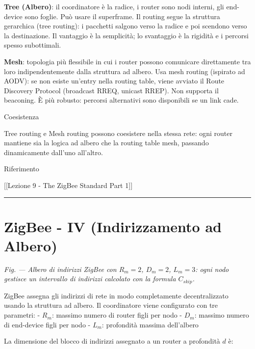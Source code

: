 \documentclass[
  italian,
  openany]{book}
\begin{document}
\textbf{Tree (Albero)}: il coordinatore è la radice, i router sono nodi
interni, gli end-device sono foglie. Può usare il superframe. Il routing
segue la struttura gerarchica (tree routing): i pacchetti salgono verso
la radice e poi scendono verso la destinazione. Il vantaggio è la
semplicità; lo svantaggio è la rigidità e i percorsi spesso subottimali.

\textbf{Mesh}: topologia più flessibile in cui i router possono
comunicare direttamente tra loro indipendentemente dalla struttura ad
albero. Usa mesh routing (ispirato ad AODV): se non esiste un'entry
nella routing table, viene avviato il Route Discovery Protocol
(broadcast RREQ, unicast RREP). Non supporta il beaconing. È più
robusto: percorsi alternativi sono disponibili se un link cade.

\begin{callouttip}{Coesistenza}

Tree routing e Mesh routing possono coesistere nella stessa rete: ogni
router mantiene sia la logica ad albero che la routing table mesh,
passando dinamicamente dall'uno all'altro.

\end{callouttip}

\begin{calloutnote}{Riferimento}

{[}{[}Lezione 9 - The ZigBee Standard Part 1{]}{]}

\end{calloutnote}

\begin{center}\rule{0.5\linewidth}{0.5pt}\end{center}

\section{ZigBee - IV (Indirizzamento ad
Albero)}\label{zigbee---iv-indirizzamento-ad-albero}

\emph{Fig. --- Albero di indirizzi ZigBee con \(R_m=2\), \(D_m=2\),
\(L_m=3\): ogni nodo gestisce un intervallo di indirizzi calcolato con
la formula \(C_{skip}\).}

ZigBee assegna gli indirizzi di rete in modo completamente
decentralizzato usando la struttura ad albero. Il coordinatore viene
configurato con tre parametri: - \(R_m\): massimo numero di router figli
per nodo - \(D_m\): massimo numero di end-device figli per nodo -
\(L_m\): profondità massima dell'albero

La dimensione del blocco di indirizzi assegnato a un router a profondità
\(d\) è:
\end{document}
